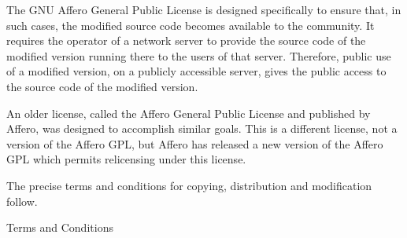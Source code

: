 \documentclass{article}%
\begin{document}
The GNU Affero General Public License is designed specifically to
ensure that, in such cases, the modified source code becomes available
to the community.        It requires the operator of a network server to
provide the source code of the modified version running there to the
users of that server.    Therefore, public use of a modified version, on
a publicly accessible server, gives the public access to the source
code of the modified version.

An older license, called the Affero General Public License and
published by Affero, was designed to accomplish similar goals.  This is
a different license, not a version of the Affero GPL, but Affero has
released a new version of the Affero GPL which permits relicensing under
this license.

The precise terms and conditions for copying, distribution and
modification follow.

\begin{center}
{\Large \sc Terms and Conditions}
\end{center}
\end{document}
